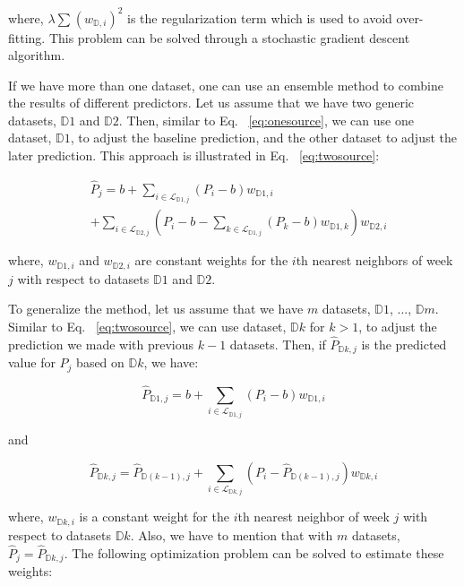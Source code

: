 where, $\lambda \sum_{}{}{{(w_{\mathbb{D},i})}^2}$ is the regularization term which is used to avoid over-fitting. This problem can be solved through a stochastic gradient descent algorithm.

If we have more than one dataset, one can use an ensemble method to combine the results of different predictors. Let us assume that we have two generic datasets, $\mathbb{D}1$ and $\mathbb{D}2$. Then, similar to Eq. ~\ref{eq:onesource}, we can use one dataset, $\mathbb{D}1$, to adjust the baseline prediction, and the other dataset to adjust the later prediction. This approach is illustrated in Eq. ~\ref{eq:twosource}:

\begin{equation}
\begin{array}{ll}
& \hat{P}_{j} =  b + \sum_{i \in \mathcal{L}_{\mathbb{D}1,j}}{} (P_i - b)w_{\mathbb{D}1,i} \\
 & + \sum_{i \in \mathcal{L}_{\mathbb{D}2,j}}{} (P_i - b - \sum_{k \in \mathcal{L}_{\mathbb{D}1,j}}{} (P_k - b)w_{\mathbb{D}1,k})w_{\mathbb{D}2,i}
\end{array}
\label{eq:twosource}
\end{equation}

where, $w_{\mathbb{D}1,i}$ and $w_{\mathbb{D}2,i}$ are constant weights for the $i$th nearest neighbors of week $j$ with respect to datasets $\mathbb{D}1$ and $\mathbb{D}2$. 

To generalize the method, let us assume that we have $m$ datasets, $\mathbb{D}1$, ...,  $\mathbb{D}m$. Similar to Eq. ~\ref{eq:twosource}, we can use dataset, $\mathbb{D}k$ for $k>1$, to adjust the prediction we made with previous $k-1$ datasets. Then, if $\hat{P}_{\mathbb{D}k,j}$ is the predicted value for $P_j$ based on $\mathbb{D}k$, we have:

\begin{equation}
\hat{P}_{\mathbb{D}1,j} = b + \sum_{i \in \mathcal{L}_{\mathbb{D}1,j}}{} (P_i - b)w_{\mathbb{D}1,i} 
\label{eq:manysource1}
\end{equation}

and

\begin{equation}
\hat{P}_{\mathbb{D}k,j} = \hat{P}_{\mathbb{D}(k-1),j} + \sum_{i \in \mathcal{L}_{\mathbb{D}k,j}}{} (P_i - \hat{P}_{\mathbb{D}(k-1),j} )w_{\mathbb{D}k,i} 
\label{eq:manysource2}
\end{equation}

where, $w_{\mathbb{D}k,i}$ is a constant weight for the $i$th nearest neighbor of week $j$ with respect to datasets $\mathbb{D}k$. Also, we have to mention that with $m$ datasets, $\hat{P}_j = \hat{P}_{\mathbb{D}k,j}$. The following optimization problem can be solved to estimate these weights:

